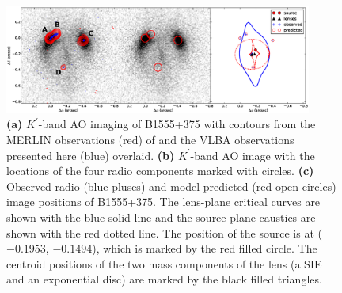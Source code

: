 \documentclass[a4paper,fleqn,usenatbib,useAMS]{mnras}
\begin{document}
\begin{figure}
\includegraphics[width=0.9\textwidth]{b1555_3panel.eps}
\caption{
{\bf (a)} $K^\prime$-band AO imaging of B1555+375 with contours from the MERLIN observations (red) of \citet{Marlow99} and the VLBA observations presented here (blue) overlaid.
%
{\bf (b)} $K^\prime$-band AO image with the locations of the four radio components
marked with circles.  
%
{\bf (c)} Observed radio (blue pluses) and model-predicted (red open
circles) image positions of B1555+375. The lens-plane critical curves
are shown with the blue solid line and the source-plane caustics are
shown with the red dotted line. The position of the source is at
($-0.1953$, $-0.1494$), which is marked by the red filled circle. The
centroid positions of the two mass components of the lens (a SIE and
an exponential disc) are marked by the black filled triangles.
}
\label{fig:3panel}
\end{figure}

% 
\end{document}
